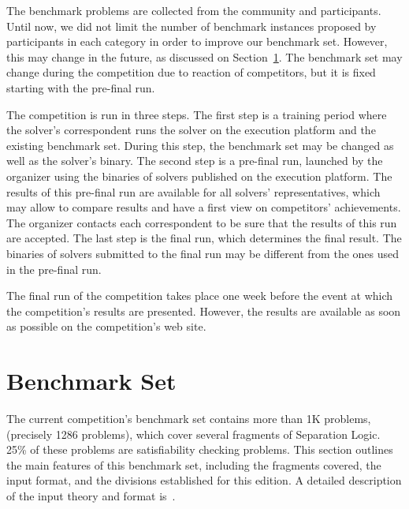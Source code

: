 \documentclass[orivec]{llncs}
\begin{document}
The benchmark problems are collected from the community and participants.
Until now, we did not limit the number of benchmark instances proposed by 
participants in each category in order to improve our benchmark set.
However, this may change in the future, as discussed on Section~\ref{sec:bench}.
The benchmark set may change during the competition due to reaction
of competitors, but it is fixed starting with the pre-final run.

The competition is run in three steps. The first step is
a training period where the solver's correspondent 
runs the solver on the execution platform and the existing benchmark set.
During this step, the benchmark set may be changed as well as the solver's
binary.
The second step is a pre-final run, launched by the organizer
using the binaries of solvers published on the execution platform.
The results of this pre-final run are available for all solvers'
representatives, which may allow to compare results and have a first view
on competitors' achievements. The organizer contacts each correspondent 
to be sure that the results of this run are accepted.
The last step is the final run, which determines the final result.
The binaries of solvers submitted to the final run may be different 
from the ones used in the pre-final run.

The final run of the competition takes place one week before the
event at which the competition's results are presented.
However, the results are available as soon as possible
on the competition's web site. 





\section{Benchmark Set}
\label{sec:bench}

The current competition's benchmark set contains more than 1K problems,
(precisely 1286 problems), which cover several fragments of Separation Logic.
25\% of these problems are satisfiability checking problems.
This section outlines the main features of this benchmark set, 
including the fragments covered, the input format, and the
divisions established for this edition.
A detailed description of the input theory and format is~\cite{IosifSRS18}.
\end{document}
